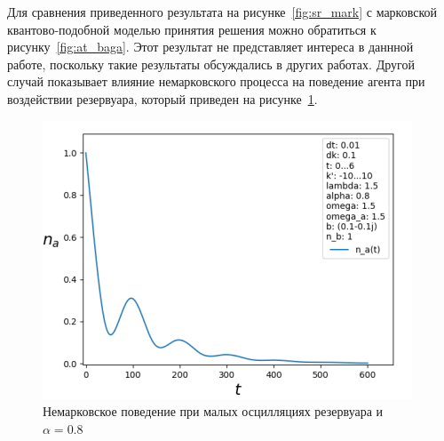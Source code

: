 Для сравнения приведенного результата на рисунке~\ref{fig:sr_mark} с марковской квантово-подобной
моделью принятия решения можно обратиться к рисунку~\ref{fig:at_baga}.
Этот результат не представляет интереса в даннной работе, поскольку такие результаты обсуждались в других работах.
Другой случай показывает влияние немарковского процесса на поведение агента при воздействии резервуара,
который приведен на рисунке~\ref{fig:sr_nomark}.
\begin{figure}[h!]
    \centering
    \captionsetup{justification=centering}
    \includegraphics[width=0.7\linewidth]{pictures/result_second_2.png}
    \caption{Немарковское поведение при малых осцилляциях резервуара и $\alpha = 0.8$}
    \label{fig:sr_nomark}
\end{figure}

